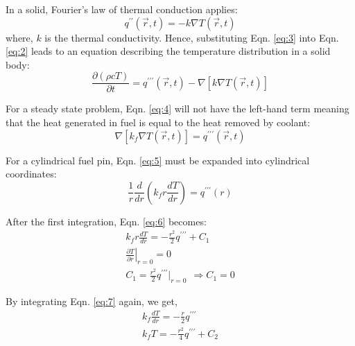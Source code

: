\documentclass[12pt]{article}
\begin{document}
\begin{multicols}{2}
In a solid, Fourier's law of thermal conduction applies:
\begin{equation}\label{eq:3}
    q^{\prime \prime} \left({\vec{r}},t\right) = -k \nabla T \left({\vec{r}},t\right)
\end{equation}
where, $k$ is the thermal conductivity. Hence, substituting Eqn. \ref{eq:3} into Eqn. \ref{eq:2} leads to an equation describing the temperature
distribution in a solid body:
\begin{equation}\label{eq:4}
    \frac{\partial (\rho cT)}{\partial t} = q^{\prime \prime \prime} \left({\vec{r}},t\right) - \nabla \left[k\nabla T \left({\vec{r}},t\right) \right]
\end{equation}

For a steady state problem, Eqn. \ref{eq:4} will not have the left-hand term meaning that the heat generated in fuel is equal to the heat removed by coolant: 
\begin{equation}\label{eq:5}
    \nabla \left[k_f \nabla T \left({\vec{r}},t\right) \right] = q^{\prime \prime \prime} \left({\vec{r}},t\right)
\end{equation}

For a cylindrical fuel pin, Eqn. \ref{eq:5} must be  expanded into cylindrical coordinates:
\begin{equation}\label{eq:6}
    \frac{1}{r}\frac{d}{dr}\left(k_f r\frac{dT}{dr} \right) = q^{\prime \prime \prime} \left(r \right)
\end{equation}

After the first integration, Eqn. \ref{eq:6} becomes:
\begin{equation}\label{eq:7}
\begin{gathered}
    k_f r \frac{dT}{dr} = -\frac{r^2}{2} q^{\prime \prime \prime} + C_1 \\
    \left.\frac{\partial T}{\partial r}\right|_{r=0}=0 \\
    C_{1}={\frac{r^{2}}{2}}q^{\prime \prime \prime}|_{r=0}~~\Rightarrow C_{1}=0    
\end{gathered}
\end{equation}

By integrating Eqn. \ref{eq:7} again, we get,
\begin{equation}\label{eq:8}
    \begin{gathered}
        k_f \frac{dT}{dr} = -\frac{r}{2} q^{\prime \prime \prime} \\
        k_f T = -\frac{r^2}{4} q^{\prime \prime \prime} +C_2
    \end{gathered}
\end{equation}


\end{multicols}
\end{document}
